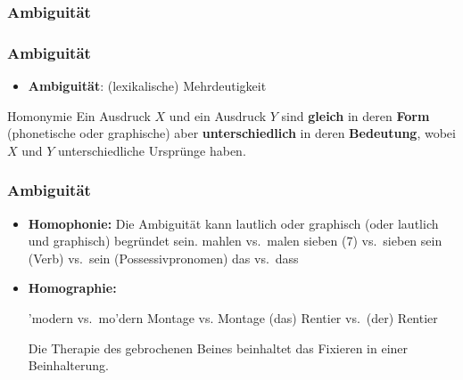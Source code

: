 %
\subsubsection{Ambiguität}
%

\begin{frame}
\frametitle{Ambiguität}

\begin{itemize}
	\item \textbf{Ambiguität}: (lexikalische) Mehrdeutigkeit \citep[vgl.][]{Kennedy11a}
\end{itemize}	

	
\begin{block}{Homonymie}
Ein Ausdruck $X$ und ein Ausdruck $Y$ sind \textbf{gleich} in deren \textbf{Form} (phonetische oder graphische) aber \textbf{unterschiedlich} in deren \textbf{Bedeutung}, wobei $X$ und $Y$ unterschiedliche Ursprünge haben.
\end{block}

\nocite{MyP18n} %

\end{frame}


\begin{frame}
\frametitle{Ambiguität}


\begin{itemize}
	\item \textbf{Homophonie:}
	Die Ambiguität kann lautlich oder graphisch (oder lautlich und graphisch) begründet sein.
	\eal
	\ex mahlen vs.\ malen 
	\ex sieben (7) vs.\ sieben
	\ex sein (Verb) vs.\ sein (Possessivpronomen)
	\ex das vs.\ dass
	\zl
	
	\item \textbf{Homographie:}
			
	\eal 
	\ex 'modern vs.\ mo'dern
	\ex Montage vs. Montage
	\ex (das) Rentier vs.\ (der) Rentier 

\pause 
	
	\ex Die Therapie des gebrochenen Beines beinhaltet das Fixieren in einer Beinhalterung.
	\zl
	
\end{itemize}
	
\end{frame}


